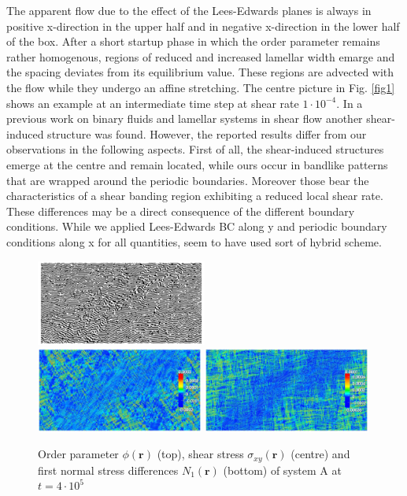 \documentclass[8.5pt,twoside,twocolumn]{article}
\newcommand{\e}[1]{\cdot10^{#1}}
\begin{document}
The apparent flow due to the effect of the Lees-Edwards planes is always in positive x-direction in the upper half and in negative x-direction in the lower half of the box.
After a short startup phase in which the order parameter remains rather homogenous, regions of reduced and increased lamellar width emarge and the spacing deviates from its equilibrium value.
These regions are advected with the flow while they undergo an affine stretching.
The centre picture in Fig. \ref{fig1} shows an example at an intermediate time step at shear rate $1\e{-4}$.
In a previous work on binary fluids and lamellar systems in shear flow \cite{Xu06b} another shear-induced structure was found.
However, the reported results differ from our observations in the following aspects.
First of all, the shear-induced structures emerge at the centre and remain located, while ours occur in bandlike patterns that are wrapped around the periodic boundaries.
Moreover those bear the characteristics of a shear banding region exhibiting a reduced local shear rate.
These differences may be a direct consequence of the different boundary conditions.
While we applied Lees-Edwards BC along y and periodic boundary conditions along x for all quantities, \cite{Xu06b} seem to have used sort of hybrid scheme.
\begin{figure}[!]
\centering
\hspace*{-0.1cm}\includegraphics[angle=0,width=0.5\textwidth]{phi_run704_400.jpg}
\includegraphics[angle=0,width=0.49\textwidth]{shear_str_run704_400.jpg}
\includegraphics[angle=0,width=0.49\textwidth]{N1_run704_400.jpg}
\caption{Order parameter $\phi({\mathbf r})$ (top), shear stress $\sigma_{xy}({\mathbf r})$ (centre) and first normal stress differences $N_1({\mathbf r})$ (bottom) of system A at $t=4\e{5}$}
\label{fig3}
\end{figure}
\end{document}
